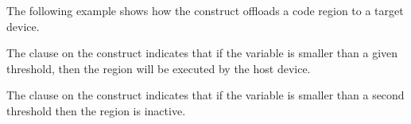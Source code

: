 The following example shows how the  construct offloads a code region 
to a target device.

The  clause on the  construct indicates that if the variable 
 is smaller than a given threshold, then the  region will be executed 
by the host device.

The  clause on the  construct indicates that if the 
variable  is smaller than a second threshold then the  region 
is inactive.



